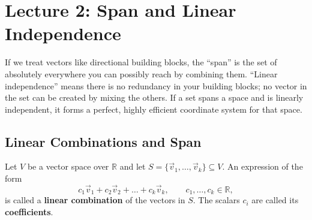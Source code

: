 \section{Lecture 2: Span and Linear Independence}

\begin{intuition}
If we treat vectors like directional building blocks, the ``span'' is the set of absolutely everywhere you can possibly reach by combining them. ``Linear independence'' means there is no redundancy in your building blocks; no vector in the set can be created by mixing the others. If a set spans a space and is linearly independent, it forms a perfect, highly efficient coordinate system for that space.
\end{intuition}

\subsection{Linear Combinations and Span}

\begin{definition}
Let $V$ be a vector space over $\mathbb{R}$ and let $S = \{\vec{v}_1, \dots, \vec{v}_k\} \subseteq V$. An expression of the form
\[
c_1\vec{v}_1 + c_2\vec{v}_2 + \dots + c_k\vec{v}_k, \qquad c_1, \dots, c_k \in \mathbb{R},
\]
is called a \textbf{linear combination} of the vectors in $S$. The scalars $c_i$ are called its \textbf{coefficients}.
\end{definition}

